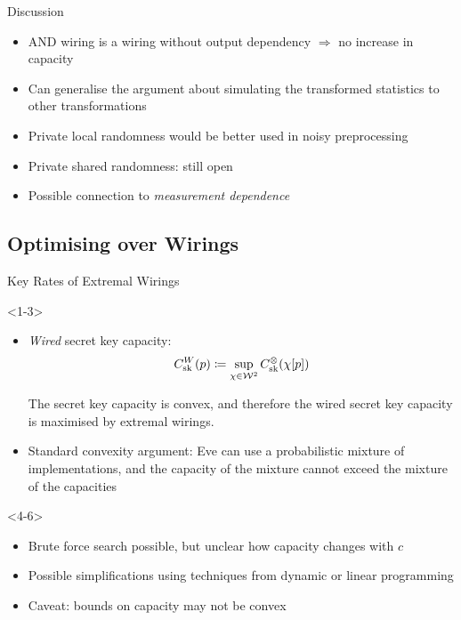\documentclass[xcolor=dvipsnames]{beamer}
\newcommand{\?}{\mathrel{?}} %
\newcommand{\sW}{\mathcal{W}}
\newcommand{\sk}{\rm sk}
\begin{document}

\begin{frame}{Discussion}
  \begin{itemize}[<+->]
    \item AND wiring is a wiring without output dependency \(\Rightarrow\) no increase in capacity
    \item Can generalise the argument about simulating the transformed statistics to other transformations
    \item Private local randomness would be better used in noisy preprocessing
    \item Private shared randomness: \alert{still open}
    \item Possible connection to \emph{measurement dependence}
  \end{itemize}
\end{frame}

\subsection{Optimising over Wirings}

\begin{frame}{Key Rates of Extremal Wirings}
  \begin{onlyenv}<1-3>
    \begin{itemize}[<+->]
      \item \emph{Wired} secret key capacity:
        \[ C^{W}_{\sk}(p) \coloneqq \sup_{\chi\in\sW^2} C^{\otimes}_{\sk}(\chi[p]) \]
        \begin{theorem}
          The secret key capacity is convex, and therefore the wired secret key capacity is maximised by extremal wirings.
        \end{theorem}
      \item Standard convexity argument: Eve can use a probabilistic mixture of implementations, and the capacity of the mixture cannot exceed the mixture of the capacities
    \end{itemize}
  \end{onlyenv}
  \begin{onlyenv}<4-6>
    \begin{itemize}[<+->]
      \item Brute force search possible, but unclear how capacity changes with \(c\)
      \item Possible simplifications using techniques from dynamic or linear programming
      \item Caveat: bounds on capacity may not be convex
    \end{itemize}
  \end{onlyenv}
\end{frame}
\end{document}
